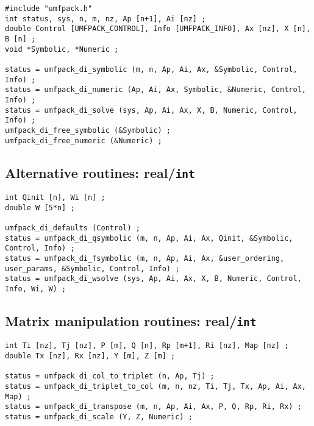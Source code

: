 \documentclass[11pt]{article}
\begin{document}
{\footnotesize
\begin{verbatim}
#include "umfpack.h"
int status, sys, n, m, nz, Ap [n+1], Ai [nz] ;
double Control [UMFPACK_CONTROL], Info [UMFPACK_INFO], Ax [nz], X [n], B [n] ;
void *Symbolic, *Numeric ;

status = umfpack_di_symbolic (m, n, Ap, Ai, Ax, &Symbolic, Control, Info) ;
status = umfpack_di_numeric (Ap, Ai, Ax, Symbolic, &Numeric, Control, Info) ;
status = umfpack_di_solve (sys, Ap, Ai, Ax, X, B, Numeric, Control, Info) ;
umfpack_di_free_symbolic (&Symbolic) ;
umfpack_di_free_numeric (&Numeric) ;
\end{verbatim}
}

\subsection{Alternative routines: real/{\tt int}}

{\footnotesize
\begin{verbatim}
int Qinit [n], Wi [n] ;
double W [5*n] ;

umfpack_di_defaults (Control) ;
status = umfpack_di_qsymbolic (m, n, Ap, Ai, Ax, Qinit, &Symbolic, Control, Info) ;
status = umfpack_di_fsymbolic (m, n, Ap, Ai, Ax, &user_ordering, user_params, &Symbolic, Control, Info) ;
status = umfpack_di_wsolve (sys, Ap, Ai, Ax, X, B, Numeric, Control, Info, Wi, W) ;
\end{verbatim}
}

\subsection{Matrix manipulation routines: real/{\tt int}}

{\footnotesize
\begin{verbatim}
int Ti [nz], Tj [nz], P [m], Q [n], Rp [m+1], Ri [nz], Map [nz] ;
double Tx [nz], Rx [nz], Y [m], Z [m] ;

status = umfpack_di_col_to_triplet (n, Ap, Tj) ;
status = umfpack_di_triplet_to_col (m, n, nz, Ti, Tj, Tx, Ap, Ai, Ax, Map) ;
status = umfpack_di_transpose (m, n, Ap, Ai, Ax, P, Q, Rp, Ri, Rx) ;
status = umfpack_di_scale (Y, Z, Numeric) ;
\end{verbatim}
}
\end{document}
